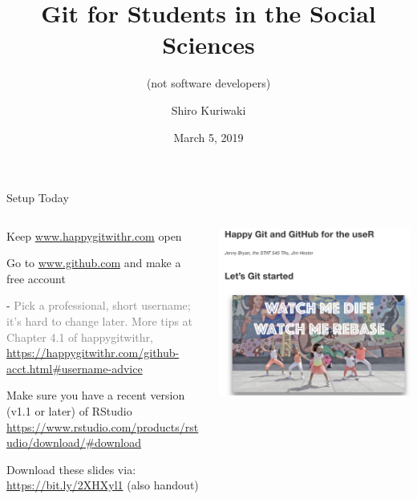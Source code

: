 \documentclass[ignorenonframetext,notes, 10pt, aspectratio=169]{beamer}
\title{\textbf{\Large{Git for Students in the Social Sciences}}}
\subtitle{(not software developers)}
\author{Shiro Kuriwaki}
\date{March 5, 2019}
\begin{document}
\begin{frame}{Setup Today}
\begin{columns}[T]
\begin{column}{0.6\textwidth}
\begin{wideenumerate}
\item Keep  \url{www.happygitwithr.com} open
\item Go to \url{www.github.com} and make a free account
\begin{wideitemize}
\item[-] \textcolor{gray}{\footnotesize Pick a professional, short username; it's hard to change later. More tips at Chapter 4.1 of happygitwithr,  \url{https://happygitwithr.com/github-acct.html\#username-advice}}
\end{wideitemize}
\item Make sure you have a recent version (v1.1 or later) of RStudio \url{https://www.rstudio.com/products/rstudio/download/\#download}
\item Download these slides via: \url{https://bit.ly/2XHXyl1} (also handout)
\end{wideenumerate}
\end{column}
\begin{column}{0.4\textwidth}
\includegraphics[width = \linewidth]{happygit.png}
\end{column}
\end{columns}
\end{frame}
\end{document}
